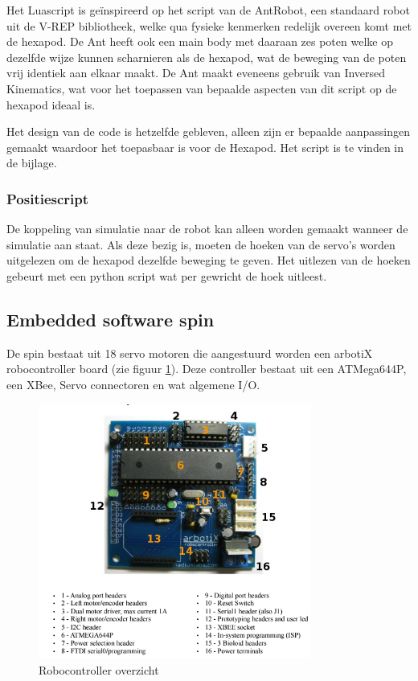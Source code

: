 \documentclass[10pt,a4paper]{article}
\begin{document}
Het Luascript is geïnspireerd op het script van de AntRobot, een standaard robot uit de V-REP bibliotheek, welke qua fysieke kenmerken redelijk overeen komt met de hexapod. De Ant heeft ook een main body met daaraan zes poten welke op dezelfde wijze kunnen scharnieren als de hexapod, wat de beweging van de poten vrij identiek aan elkaar maakt. De Ant maakt eveneens gebruik van Inversed Kinematics, wat voor het toepassen van bepaalde aspecten van dit script op de hexapod ideaal is.

Het design van de code is hetzelfde gebleven, alleen zijn er bepaalde aanpassingen gemaakt waardoor het toepasbaar is voor de Hexapod. Het script is te vinden in de bijlage.

\subsubsection{Positiescript}

De koppeling van simulatie naar de robot kan alleen worden gemaakt wanneer de simulatie aan staat. Als deze bezig is, moeten de hoeken van de servo's worden uitgelezen om de hexapod dezelfde beweging te geven. Het uitlezen van de hoeken gebeurt met een python script wat per gewricht de hoek uitleest.





\subsection{Embedded software spin}
De spin bestaat uit 18 servo motoren die aangestuurd worden een 	arbotiX robocontroller board (zie figuur \ref{fig:robocontroller-overview}). Deze controller bestaat uit een ATMega644P, een XBee, Servo connectoren en wat algemene I/O.
\begin{figure}[h]
    \centering
    \includegraphics[width=0.8\textwidth]{robocontroller-overview.png}
    \caption{Robocontroller overzicht}
    \label{fig:robocontroller-overview}
\end{figure}
\end{document}
